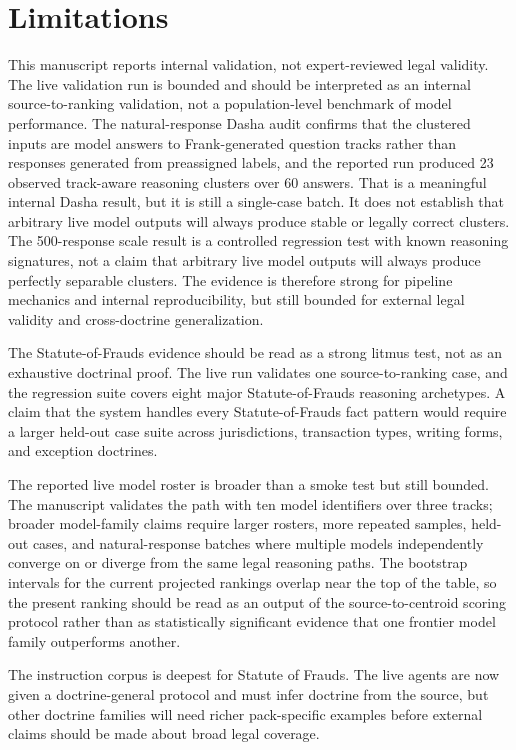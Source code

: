 \section{Limitations}

This manuscript reports internal validation, not expert-reviewed legal validity.
The live validation run is bounded and should be interpreted as an internal
source-to-ranking validation, not a population-level benchmark of model
performance. The natural-response Dasha audit confirms that the clustered inputs
are model answers to Frank-generated question tracks rather than responses
generated from preassigned labels, and the reported run produced 23 observed
track-aware reasoning clusters over 60 answers. That is a meaningful internal
Dasha result, but it is still a single-case batch. It does not establish that
arbitrary live model outputs will always produce stable or legally correct
clusters. The
500-response scale result is a controlled regression test with known reasoning
signatures, not a claim that arbitrary live model outputs will always produce
perfectly separable clusters. The evidence is therefore strong for pipeline
mechanics and internal reproducibility, but still bounded for external legal
validity and cross-doctrine generalization.

The Statute-of-Frauds evidence should be read as a strong litmus test, not as an
exhaustive doctrinal proof. The live run validates one source-to-ranking case,
and the regression suite covers eight major Statute-of-Frauds reasoning
archetypes. A claim that the system handles every Statute-of-Frauds fact pattern
would require a larger held-out case suite across jurisdictions, transaction
types, writing forms, and exception doctrines.

The reported live model roster is broader than a smoke test but still bounded.
The manuscript validates the path with ten model identifiers over three tracks;
broader model-family claims require larger rosters, more repeated samples,
held-out cases, and natural-response batches where multiple models
independently converge on or diverge from the same legal reasoning paths.
The bootstrap intervals for the current projected rankings overlap near the top
of the table, so the present ranking should be read as an output of the
source-to-centroid scoring protocol rather than as statistically significant
evidence that one frontier model family outperforms another.

The instruction corpus is deepest for Statute of Frauds. The live agents are now
given a doctrine-general protocol and must infer doctrine from the source, but
other doctrine families will need richer pack-specific examples before external
claims should be made about broad legal coverage.

